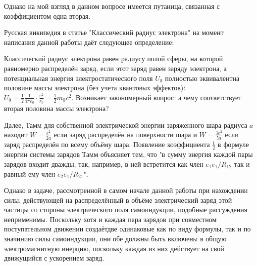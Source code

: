 \documentclass{article}
\begin{document}
Однако на мой взгляд в данном вопросе имеется путаница, связанная с коэффициентом одна вторая. 

Русская википедия в статье "Классический радиус электрона"  на момент написания данной работы даёт следующее определение:

Классический радиус электрона равен радиусу полой сферы, на которой равномерно распределён заряд, если этот заряд равен заряду электрона, а потенциальная энергия электростатического поля ${U}_{0}$  полностью эквивалентна половине массы электрона (без учета квантовых эффектов):
${\displaystyle U_{0}={\frac {1}{2}}{\frac {1}{4\pi \varepsilon _{0}}}\cdot {\frac {e^{2}}{r_{0}}}={\frac {1}{2}}m_{0}c^{2}}$.
Возникает закономерный вопрос: а чему соответствует вторая половина массы электрона?

Далее, Тамм \cite{tamm} для собственной электрической энергии заряженного шара радиуса $a$ находит $W=\frac{e^2}{2a}$ если заряд распределён на поверхности шара и $W=\frac{3e^2}{5a}$ если заряд распределён по всему объёму шара. Появление коэффициента $\frac{1}{2}$  в формуле энергии системы зарядов Тамм объясняет тем, что "в сумму энергия каждой пары зарядов входит дважды, так, например, в ней встретится как член ${e_{1}}{e_{1}}/{R_{12}}$ так и равный ему член ${e_{2}}{e_{1}}/{R_{21}}$".

Однако в задаче, рассмотренной в самом начале данной работы при нахождении силы, действующей на распределённый в объёме электрический заряд этой частицы со стороны электрического поля самоиндукции, подобные рассуждения неприменимы. Поскольку хотя и каждая пара зарядов  при совместном поступательном движении создаётдве  одинаковые как по виду формулы, так и по значинию силы самоиндукции, они обе должны быть включены в общую электромагнитную инерцию, поскольку каждая из них действует на свой движущийся с ускорением заряд.

\end{document}
